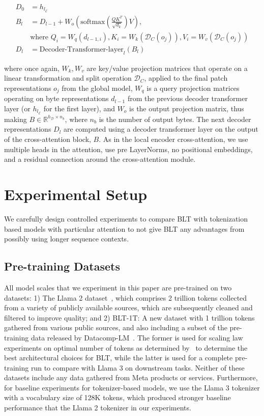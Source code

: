 \begin{align}
D_0 &= h_{l_{\mathcal{E}}} \\
B_l &= D_{l-1} + W_o\left(\text{softmax}\left(\frac{QK^T}{\sqrt{d_k}}\right)V\right), \\
  &\text{where } Q_i = W_q(d_{l-1,i}), K_i = W_k(\mathcal{D}_C(o_j)), V_i = W_v(\mathcal{D}_C(o_j)) \\
  D_l &= \text{Decoder-Transformer-layer}_l(B_l)
\end{align}

where once again, $W_k, W_v$ are key/value projection matrices that operate on a linear transformation and split operation $\mathcal{D}_C$, applied to the final patch representations $o_j$ from the global model, $W_q$ is a query projection matrices operating on byte representations $d_{l-1}$ from the previous decoder transformer layer (or $h_{l_{\mathcal{E}}}$ for the first layer), and $W_o$ is the output projection matrix, thus making $B \in \mathbb{R}^{h_{\mathcal{D}} \times n_b}$, where $n_b$ is the number of output bytes. The next decoder representations $D_l$ are computed using a decoder transformer layer on the output of the cross-attention block, $B$. As in the local encoder cross-attention, we use multiple heads in the attention, use pre LayerNorms, no positional embeddings, and a residual connection around the cross-attention module. 

\section{Experimental Setup}
\label{section:experiments}
We carefully design controlled experiments to compare {\textsc BLT} with tokenization based models with particular attention to not give {\textsc BLT} any advantages from possibly using longer sequence contexts. 

\subsection{Pre-training Datasets} All model scales that we experiment in this paper are pre-trained on two datasets: 1) The Llama 2 dataset~\citep{touvron2023llama}, which comprises 2 trillion tokens collected from a variety of publicly available sources, which are subsequently cleaned and filtered to improve quality; and 2) {\textsc BLT}-1T: A new dataset with 1 trillion tokens gathered from various public sources, and also including a subset of the pre-training data released by Datacomp-LM~\citep{li2024datacomp}. The former is used for scaling law experiments on optimal number of tokens as determined by~\cite{dubey2024llama} to determine the best architectural choices for {\textsc BLT}, while the latter is used for a complete pre-training run to compare with Llama 3 on downstream tasks. Neither of these datasets include any data gathered from Meta products or services. Furthermore, for baseline experiments for tokenizer-based models, we use the Llama 3 tokenizer with a vocabulary size of 128K tokens, which produced stronger baseline performance that the Llama 2 tokenizer in our experiments.

